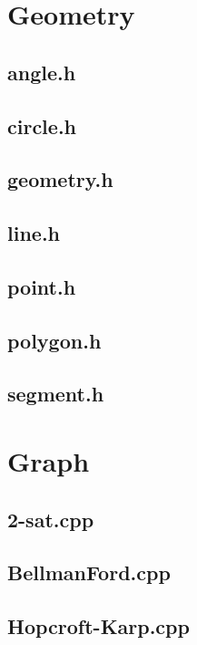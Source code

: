 \section{Geometry}
\subsection{angle.h}

\subsection{circle.h}

\subsection{geometry.h}

\subsection{line.h}

\subsection{point.h}

\subsection{polygon.h}

\subsection{segment.h}

\section{Graph}
\subsection{2-sat.cpp}

\subsection{BellmanFord.cpp}

\subsection{Hopcroft-Karp.cpp}

